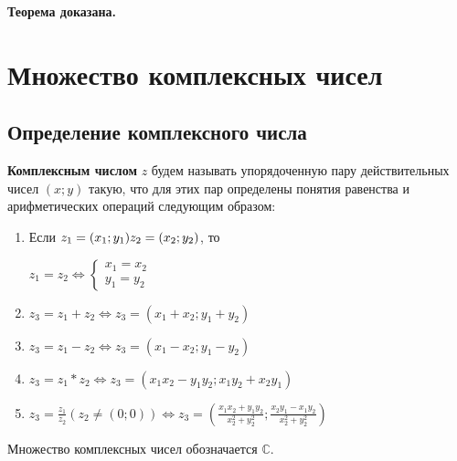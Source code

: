 \documentclass{article}
\newcommand{\parspace}{\vspace{10pt}}
\theoremstyle{break}
\begin{document}
\textbf{Теорема доказана.}

\section{Множество комплексных чисел}

\subsection{Определение комплексного числа}

\textbf{Комплексным числом} $z$ будем называть упорядоченную пару действительных
чисел $(x;y)$ такую, что для этих пар определены понятия равенства и арифметических
операций следующим образом:

\begin{enumerate}
    \item Если $\\ z_1 = (x_1;y_1) \\ z_2 = (x_2;y_2)$, то
    
    $z_1 = z_2 \Leftrightarrow \begin{cases}
        x_1 = x_2 \\
        y_1 = y_2
    \end{cases}$

    \item $z_3 = z_1 + z_2 \Leftrightarrow z_3 = (x_1 + x_2; y_1 + y_2)$
    \item $z_3 = z_1 - z_2 \Leftrightarrow z_3 = (x_1 - x_2; y_1 - y_2)$
    \item $z_3 = z_1 * z_2 \Leftrightarrow z_3 = (x_1 x_2 - y_1 y_2; x_1 y_2 + x_2 y_1)$
    \item $z_3 = \frac{z_1}{z_2} (z_2 \neq (0; 0)) \Leftrightarrow 
    z_3 = (\frac{x_1 x_2 + y_1 y_2}{x_2^2 + y_2^2}; \frac{x_2 y_1 - x_1 y_2}{x_2^2 + y_2^2})$
\end{enumerate}

Множество комплексных чисел обозначается $\mathbb{C}$.

\parspace
\end{document}
